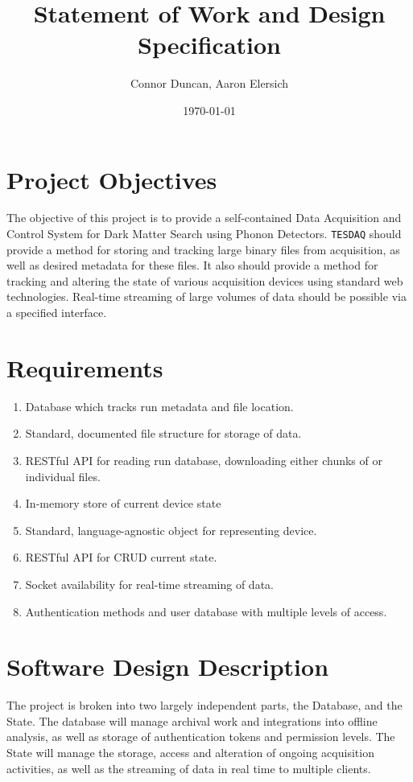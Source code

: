 \documentclass{article}
\author{Connor Duncan, Aaron Elersich}
\date{\today}
\title{\td Statement of Work and Design Specification}
\newcommand{\td}{\texttt{TESDAQ} }
\begin{document}
\maketitle
\tableofcontents
\section{Project Objectives}
The objective of this project is to provide a self-contained Data Acquisition and Control System for Dark Matter Search using Phonon Detectors.
\td should provide a method for storing and tracking large binary files from acquisition, as well as desired metadata for these files.
It also should provide a method for tracking and altering the state of various acquisition devices using standard web technologies.
Real-time streaming of large volumes of data should be possible via a specified interface.
\section{Requirements}
\begin{enumerate}
	\item Database which tracks run metadata and file location.
	\item Standard, documented file structure for storage of data.
	\item RESTful API for reading run database, downloading either chunks of or individual files.
	\item In-memory store of current device state
	\item Standard, language-agnostic object for representing device.
	\item RESTful API for CRUD current state.
	\item Socket availability for real-time streaming of data.
	\item Authentication methods and user database with multiple levels of access.
\end{enumerate}
\section{Software Design Description}
The project is broken into two largely independent parts, the Database, and the State.
The database will manage archival work and integrations into offline analysis, as well as storage of authentication tokens and permission levels.
The State will manage the storage, access and alteration of ongoing acquisition activities, as well as the streaming of data in real time to multiple clients.
\end{document}
